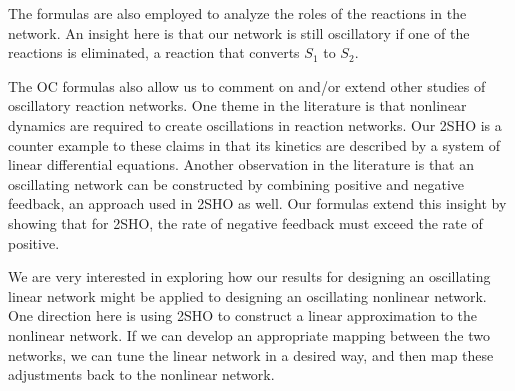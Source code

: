 \documentclass{bmcart}
\begin{document}
The formulas are also employed to analyze the roles of the reactions in the network. An insight here is that our network is still oscillatory if one of the reactions is eliminated, a reaction that converts $S_1$ to $S_2$. 

The OC formulas also allow us to comment on and/or extend other studies of oscillatory reaction networks. One theme in the literature is that nonlinear dynamics are required to create oscillations in reaction networks. Our 2SHO is a counter example to these claims
in that its kinetics are described by a system of linear differential equations. Another observation in the literature is that an oscillating network can be constructed by combining positive and negative feedback, an approach used in 2SHO as well. Our formulas extend this insight by showing that for 2SHO, the rate of negative feedback must exceed the rate of positive.

We are very interested in exploring how our results for designing an oscillating linear network might be applied to designing an oscillating nonlinear network. One direction here is using 2SHO to construct a linear approximation to the nonlinear network. If we can develop an appropriate mapping between the two networks, we can tune the linear network in a desired way, and then map these adjustments back to the nonlinear network.


\end{document}
